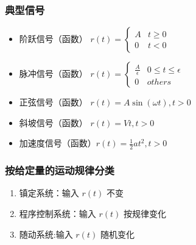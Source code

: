\documentclass{beamer}
\begin{document}
\begin{frame}
\frametitle{典型信号}
\label{sec-1-4}

\begin{itemize}
\item <2->阶跃信号（函数）  $r(t)=\begin{cases} A & t\geq 0 \\ 0 & t < 0 \end{cases}$
\item <3->脉冲信号（函数）  $r(t)=\begin{cases}\frac{A}{\epsilon}  & 0\leq t\leq \epsilon\\ 0 & others\end{cases}$
\item <4->正弦信号（函数）  $r(t)=A\sin(\omega t), t>0$
\item <5->斜坡信号（函数）  $r(t)=Vt  ,     t>0$
\item <6->加速度信号（函数）$r(t)=\frac{1}{2}at^2,  t>0$
\end{itemize}
\end{frame}
\begin{frame}
\frametitle{按给定量的运动规律分类}
\label{sec-1-5}

\begin{enumerate}
\item <2->镇定系统：输入 $r(t)$ 不变
\item <3->程序控制系统：输入 $r(t)$ 按规律变化
\item <4->随动系统:输入 $r(t)$ 随机变化
\end{enumerate}
\end{frame}
\end{document}

